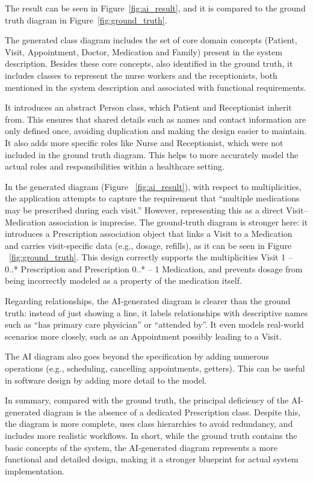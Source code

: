 The result can be seen in Figure~\ref{fig:ai_result}, and it is compared to the ground truth diagram in Figure~\ref{fig:ground_truth}.


The generated class diagram includes the set of core domain concepts (Patient, Visit, Appointment, Doctor, Medication and Family) present in the system description. Besides these core concepts, also identified in the ground truth, it includes classes to represent the nurse workers and the receptionists, both mentioned in the system description and associated with functional requirements.

It introduces an abstract Person class, which Patient and Receptionist inherit from. This ensures that shared details such as names and contact information are only defined once, avoiding duplication and making the design easier to maintain. It also adds more specific roles like Nurse and Receptionist, which were not included in the ground truth diagram. This helps to more accurately model the actual roles and responsibilities within a healthcare setting.

In the generated diagram (Figure ~\ref{fig:ai_result}), with respect to multiplicities, the application attempts to capture the requirement that “multiple medications may be prescribed during each visit.” However, representing this as a direct Visit--Medication association is imprecise. The ground-truth diagram is stronger here: it introduces a Prescription association object that links a Visit to a Medication and carries visit-specific data (e.g., dosage, refills), as it can be seen in Figure ~\ref{fig:ground_truth}. This design correctly supports the multiplicities Visit 1 -- 0..* Prescription and Prescription 0..* -- 1 Medication, and prevents dosage from being incorrectly modeled as a property of the medication itself.

Regarding relationships, the AI-generated diagram is clearer than the ground truth: instead of just showing a line, it labels relationships with descriptive names such as ``has primary care physician'' or ``attended by''. It even models real-world scenarios more closely, such as an Appointment possibly leading to a Visit.

The AI diagram also goes beyond the specification by adding numerous operations (e.g., scheduling, cancelling appointments, getters). This can be useful in software design by adding more detail to the model.

In summary, compared with the ground truth, the principal deficiency of the AI-generated diagram is the absence of a dedicated Prescription class. Despite this, the diagram is more complete, uses class hierarchies to avoid redundancy, and includes more realistic workflows. In short, while the ground truth contains the basic concepts of the system, the AI-generated diagram represents a more functional and detailed design, making it a stronger blueprint for actual system implementation.


